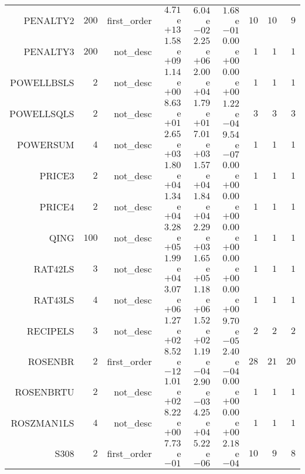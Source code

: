 \begin{longtable}{rrrrrrrrr}
PENALTY2 & \(   200\) & first\_order & \( 4.71\)e\(+13\) & \( 6.04\)e\(-02\) & \( 1.68\)e\(-01\) & \(    10\) & \(    10\) & \(     9\) \\
PENALTY3 & \(   200\) & not\_desc & \( 1.58\)e\(+09\) & \( 2.25\)e\(+06\) & \( 0.00\)e\(+00\) & \(     1\) & \(     1\) & \(     1\) \\
POWELLBSLS & \(     2\) & not\_desc & \( 1.14\)e\(+00\) & \( 2.00\)e\(+04\) & \( 0.00\)e\(+00\) & \(     1\) & \(     1\) & \(     1\) \\
POWELLSQLS & \(     2\) & not\_desc & \( 8.63\)e\(+01\) & \( 1.79\)e\(+01\) & \( 1.22\)e\(-04\) & \(     3\) & \(     3\) & \(     3\) \\
POWERSUM & \(     4\) & not\_desc & \( 2.65\)e\(+03\) & \( 7.01\)e\(+03\) & \( 9.54\)e\(-07\) & \(     1\) & \(     1\) & \(     1\) \\
PRICE3 & \(     2\) & not\_desc & \( 1.80\)e\(+04\) & \( 1.57\)e\(+04\) & \( 0.00\)e\(+00\) & \(     1\) & \(     1\) & \(     1\) \\
PRICE4 & \(     2\) & not\_desc & \( 1.34\)e\(+04\) & \( 1.84\)e\(+04\) & \( 0.00\)e\(+00\) & \(     1\) & \(     1\) & \(     1\) \\
QING & \(   100\) & not\_desc & \( 3.28\)e\(+05\) & \( 2.29\)e\(+03\) & \( 0.00\)e\(+00\) & \(     1\) & \(     1\) & \(     1\) \\
RAT42LS & \(     3\) & not\_desc & \( 1.99\)e\(+04\) & \( 1.65\)e\(+05\) & \( 0.00\)e\(+00\) & \(     1\) & \(     1\) & \(     1\) \\
RAT43LS & \(     4\) & not\_desc & \( 3.07\)e\(+06\) & \( 1.18\)e\(+06\) & \( 0.00\)e\(+00\) & \(     1\) & \(     1\) & \(     1\) \\
RECIPELS & \(     3\) & not\_desc & \( 1.27\)e\(+02\) & \( 1.52\)e\(+02\) & \( 9.70\)e\(-05\) & \(     2\) & \(     2\) & \(     2\) \\
ROSENBR & \(     2\) & first\_order & \( 8.52\)e\(-12\) & \( 1.19\)e\(-04\) & \( 2.40\)e\(-04\) & \(    28\) & \(    21\) & \(    20\) \\
ROSENBRTU & \(     2\) & not\_desc & \( 1.01\)e\(+02\) & \( 2.90\)e\(-03\) & \( 0.00\)e\(+00\) & \(     1\) & \(     1\) & \(     1\) \\
ROSZMAN1LS & \(     4\) & not\_desc & \( 8.22\)e\(+00\) & \( 4.25\)e\(+04\) & \( 0.00\)e\(+00\) & \(     1\) & \(     1\) & \(     1\) \\
S308 & \(     2\) & first\_order & \( 7.73\)e\(-01\) & \( 5.22\)e\(-06\) & \( 2.18\)e\(-04\) & \(    10\) & \(     9\) & \(     8\) \\

\end{longtable}
